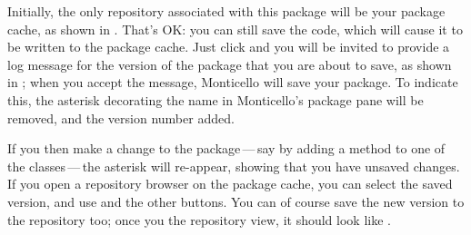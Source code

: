 \documentclass[a4paper,10pt,twoside]{book}
\begin{document}
Initially, the only repository associated with this package will be your package cache, as shown in .  That's OK: you can still save the code, which will cause it to be written to the package cache.  
Just click  and you will be invited to provide a log message for the version of the package that you are about to save, as shown in ; when you accept the message, Monticello will save your package.
To indicate this, the asterisk decorating the name in Monticello's package pane will be removed, and the version number added.

If you then make a change to the package\,---\,say by adding a method to one of the classes\,---\,the asterisk will re-appear, showing that you have unsaved changes.  If you open a repository browser on the package cache, you can select the saved version, and use  and the other buttons.  
You can of course save the new version to the repository too; once you  the repository view, it should look like .
\end{document}
